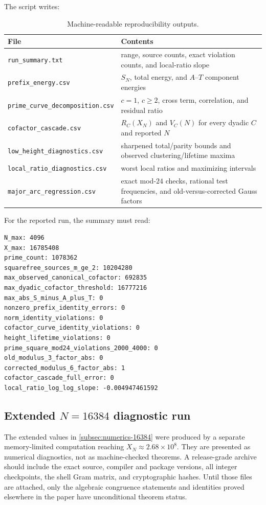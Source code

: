 \documentclass[11pt]{article}
\theoremstyle{definition}
\newcommand{\1}{\mathbf{1}}
\begin{document}
The script writes:

\begin{table}[htbp]
\centering
\caption{Machine-readable reproducibility outputs.}
\label{tab:repro-files}
\small
\begin{tabular}{lp{}}
\toprule
File & Contents\\
\midrule
\texttt{run\_summary.txt}
& range, source counts, exact violation counts, and local-ratio slope\\
\texttt{prefix\_energy.csv}
& $S_N$, total energy, and $A$--$T$ component energies\\
\texttt{prime\_curve\_decomposition.csv}
& $c=1$, $c\ge2$, cross term, correlation, and residual ratio\\
\texttt{cofactor\_cascade.csv}
& $R_C(X_N)$ and $V_C(N)$ for every dyadic $C$ and reported $N$\\
\texttt{low\_height\_diagnostics.csv}
& sharpened total/parity bounds and observed clustering/lifetime maxima\\
\texttt{local\_ratio\_diagnostics.csv}
& worst local ratios and maximizing intervals\\
\texttt{major\_arc\_regression.csv}
& exact mod-$24$ checks, rational test frequencies, and old-versus-corrected Gauss factors\\
\bottomrule
\end{tabular}
\end{table}

For the reported run, the summary must read:
\begin{verbatim}
N_max: 4096
X_max: 16785408
prime_count: 1078362
squarefree_sources_m_ge_2: 10204280
max_observed_canonical_cofactor: 692835
max_dyadic_cofactor_threshold: 16777216
max_abs_S_minus_A_plus_T: 0
nonzero_prefix_identity_errors: 0
norm_identity_violations: 0
cofactor_curve_identity_violations: 0
height_lifetime_violations: 0
prime_square_mod24_violations_2000_4000: 0
old_modulus_3_factor_abs: 0
corrected_modulus_6_factor_abs: 1
cofactor_cascade_full_error: 0
local_ratio_log_log_slope: -0.004947461592
\end{verbatim}

\subsection{\texorpdfstring{Extended $N=16384$ diagnostic run}{Extended N=16384 diagnostic run}}

The extended values in \cref{subsec:numerics-16384} were produced by a separate memory-limited computation reaching $X_N\approx2.68\times10^8$.  They are presented as numerical diagnostics, not as machine-checked theorems.  A release-grade archive should include the exact source, compiler and package versions, all integer checkpoints, the shell Gram matrix, and cryptographic hashes.  Until those files are attached, only the algebraic congruence statements and identities proved elsewhere in the paper have unconditional theorem status.
\end{document}
